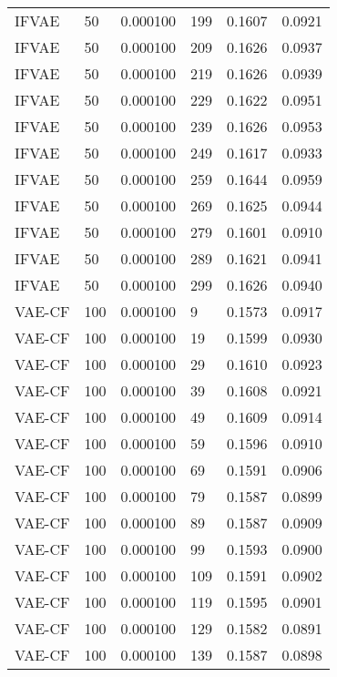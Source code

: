 \begin{tabular}{llrlrr}
   IFVAE &   50 &  0.000100 &   199 &  0.1607 &       0.0921 \\
   IFVAE &   50 &  0.000100 &   209 &  0.1626 &       0.0937 \\
   IFVAE &   50 &  0.000100 &   219 &  0.1626 &       0.0939 \\
   IFVAE &   50 &  0.000100 &   229 &  0.1622 &       0.0951 \\
   IFVAE &   50 &  0.000100 &   239 &  0.1626 &       0.0953 \\
   IFVAE &   50 &  0.000100 &   249 &  0.1617 &       0.0933 \\
   IFVAE &   50 &  0.000100 &   259 &  0.1644 &       0.0959 \\
   IFVAE &   50 &  0.000100 &   269 &  0.1625 &       0.0944 \\
   IFVAE &   50 &  0.000100 &   279 &  0.1601 &       0.0910 \\
   IFVAE &   50 &  0.000100 &   289 &  0.1621 &       0.0941 \\
   IFVAE &   50 &  0.000100 &   299 &  0.1626 &       0.0940 \\
  VAE-CF &  100 &  0.000100 &     9 &  0.1573 &       0.0917 \\
  VAE-CF &  100 &  0.000100 &    19 &  0.1599 &       0.0930 \\
  VAE-CF &  100 &  0.000100 &    29 &  0.1610 &       0.0923 \\
  VAE-CF &  100 &  0.000100 &    39 &  0.1608 &       0.0921 \\
  VAE-CF &  100 &  0.000100 &    49 &  0.1609 &       0.0914 \\
  VAE-CF &  100 &  0.000100 &    59 &  0.1596 &       0.0910 \\
  VAE-CF &  100 &  0.000100 &    69 &  0.1591 &       0.0906 \\
  VAE-CF &  100 &  0.000100 &    79 &  0.1587 &       0.0899 \\
  VAE-CF &  100 &  0.000100 &    89 &  0.1587 &       0.0909 \\
  VAE-CF &  100 &  0.000100 &    99 &  0.1593 &       0.0900 \\
  VAE-CF &  100 &  0.000100 &   109 &  0.1591 &       0.0902 \\
  VAE-CF &  100 &  0.000100 &   119 &  0.1595 &       0.0901 \\
  VAE-CF &  100 &  0.000100 &   129 &  0.1582 &       0.0891 \\
  VAE-CF &  100 &  0.000100 &   139 &  0.1587 &       0.0898 \\

\end{tabular}
